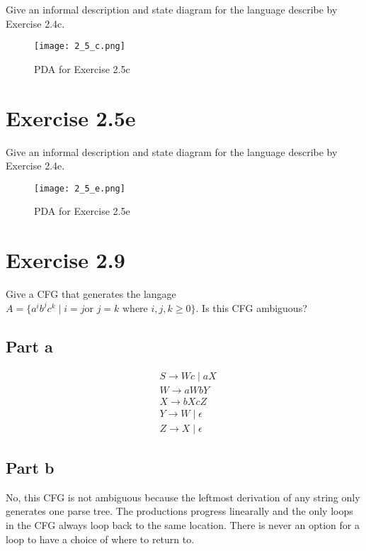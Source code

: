 \documentclass{article}
\newcommand{\where}{\mid}
\begin{document}
Give an informal description and state diagram for the language describe by
Exercise 2.4c.

\begin{figure}[h!]
	\centering
	\texttt{[image: 2\_5\_c.png]}
	\caption{PDA for Exercise 2.5c}
\end{figure}

\section{Exercise 2.5e}

Give an informal description and state diagram for the language describe by
Exercise 2.4e.

\begin{figure}[h!]
	\centering
	\texttt{[image: 2\_5\_e.png]}
	\caption{PDA for Exercise 2.5e}
\end{figure}

\section{Exercise 2.9}

Give a CFG that generates the langage $A = \{ a^i b^j c^k \where i = j \text{
or } j = k \text{ where } i, j, k \geq 0 \}$. Is this CFG ambiguous?

\subsection{Part a}

\begin{align*}
	& S \rightarrow Wc \mid aX\\
	& W \rightarrow aWbY\\
	& X \rightarrow bXcZ\\
	& Y \rightarrow W \mid \epsilon\\
	& Z \rightarrow X \mid \epsilon
\end{align*}

\subsection{Part b}

No, this CFG is not ambiguous because the leftmost derivation of any string
only generates one parse tree. The productions progress linearally and the only
loops in the CFG always loop back to the same location. There is never an option
for a loop to have a choice of where to return to.
\end{document}
